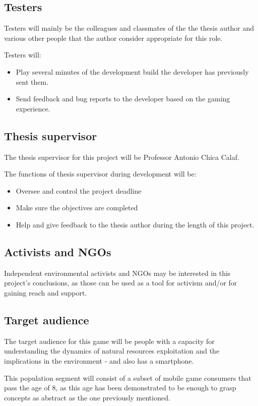 \subsection{Testers}

Testers will mainly be the colleagues and classmates of the the thesis author and various other people that the author consider appropriate for this role.

Testers will:

\begin{itemize}
\item Play several minutes of the development build the developer has previously sent them.
\item Send feedback and bug reports to the developer based on the gaming experience. 
\end{itemize}

\subsection{Thesis supervisor}

The thesis supervisor for this project will be Professor Antonio Chica Calaf.

The functions of thesis supervisor during development will be:

\begin{itemize}
\item Oversee and control the project deadline
\item Make sure the objectives are completed
\item Help and give feedback to the thesis author during the length of this project.
\end{itemize}

\subsection{Activists and \glspl{NGO}}

Independent environmental activists and \glspl{NGO} may be interested in this project's conclusions, as those can be used as a tool for activism and/or for gaining reach and support. 

\subsection{Target audience}

The target audience for this game will be people with a capacity for understanding the dynamics of natural resources exploitation and the implications in the environment - and also has a smartphone.

This population segment will consist of a subset of mobile game consumers that pass the age of 8, as this age has been demonstrated
\cite{childdevelopment}
to be enough to grasp concepts as abstract as the one previously mentioned.


